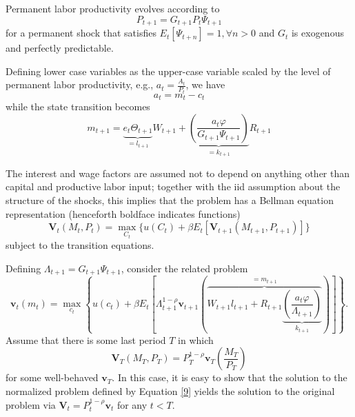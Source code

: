 \documentclass[12pt]{article}
\theoremstyle{definition}
\begin{document}
Permanent labor productivity evolves according to 
\begin{equation}
	\label{5}
	P_{t+1} = G_{t+1}P_t \Psi_{t+1} 
\end{equation}
for a permanent shock that satisfies $E_t\left[\Psi_{t+n}\right] = 1, \forall n > 0$ and $G_t$ is exogenous and perfectly predictable.

Defining lower case variables as the upper-case variable scaled by the level of permanent labor productivity, e.g., $a_t = \frac{A_t}{P_t}$, we have
\begin{equation}
	\label{6}
	a_t = m_t - c_t
\end{equation}
while the state transition becomes
\begin{equation}
	\label{7}
	m_{t+1}=\underbrace{e_t \Theta_{t+1}}_{=l_{t+1}} W_{t+1}+\underbrace{\left( \frac{a_t \varphi}{G_{t+1} \Psi_{t+1}} \right)}_{=k_{t+1}} R_{t+1}
\end{equation}

The interest and wage factors are assumed not to depend on anything other than capital and productive labor input; together with the iid assumption about the structure of the shocks, this implies that the problem has a Bellman equation representation (henceforth boldface indicates functions)
\begin{equation}
	\label{8}
	\mathbf{V}_t\left(M_t, P_t\right)=\max _{C_t}\bigl\{u\left(C_t\right)+\beta E_t\left[\mathbf{V}_{t+1}\left(M_{t+1}, P_{t+1}\right)\right]\bigl\}
\end{equation}
subject to the transition equations.

Defining $\Lambda_{t+1} = G_{t+1}\Psi_{t+1}$, consider the related problem
\begin{equation}
	\label{9}
	\mathbf{v}_t\left(m_t\right)=\max _{c_t}\left\{u\left(c_t\right)+\beta E_t\left[\Lambda_{t+1}^{1-\rho} \mathbf{v}_{t+1}\left( \overbrace{W_{t+1} l_{t+1}+R_{t+1} \underbrace{\left( \frac{a_t \varphi }{\Lambda_{t+1}} \right)}_{k_{t+1}}}^{=m_{t+1}}\right) \right]\right\} .
\end{equation}
Assume that there is some last period $T$ in which 
\begin{equation}
	\label{10}
	\mathbf{V}_T\left(M_T, P_T\right)=P_T^{1-\rho} \mathbf{v}_T\left( \frac{M_T}{P_T}\right)
\end{equation}
for some well-behaved $\mathbf{v}_T$. In this case, it is easy to show that the solution to the normalized problem defined by Equation \ref{9} yields the solution to the original problem via $\mathbf{V}_t = P_t^{1-\rho}\mathbf{v}_t$ for any $t<T$.
\end{document}
